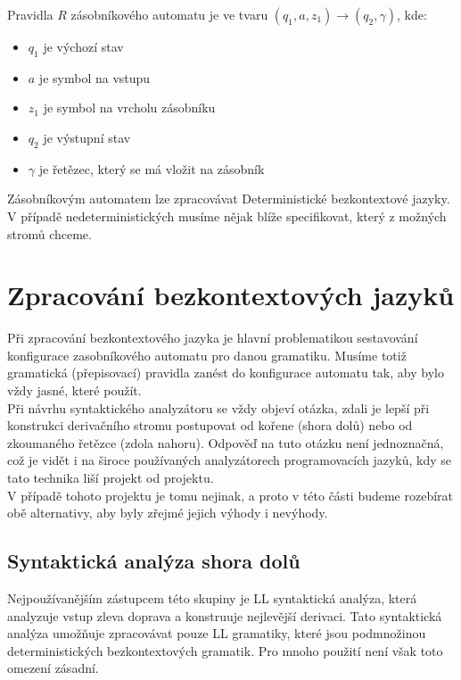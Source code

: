 \noindent
Pravidla $R$ zásobníkového automatu je ve tvaru $(q_1, a, z_1) \rightarrow (q_2, \gamma)$, kde:

\begin{itemize}
  \item $q_1$ je výchozí stav
  \item $a$ je symbol na vstupu
  \item $z_1$ je symbol na vrcholu zásobníku
  \item $q_2$ je výstupní stav
  \item $\gamma$ je řetězec, který se má vložit na zásobník
\end{itemize}

Zásobníkovým automatem lze zpracovávat Deterministické bezkontextové jazyky.
V případě nedeterministických musíme nějak blíže specifikovat, který z možných
stromů chceme.\\

\section{Zpracování bezkontextových jazyků}
\label{sec:CFLanguagesProcessing}

Při zpracování bezkontextového jazyka je hlavní problematikou
sestavování konfigurace zasobníkového automatu pro danou gramatiku.
Musíme totiž gramatická (přepisovací) pravidla zanést do konfigurace
automatu tak, aby bylo vždy jasné, které použít.\\

Při návrhu syntaktického analyzátoru se vždy objeví otázka, zdali je lepší
při konstrukci derivačního stromu postupovat od kořene (shora dolů) nebo od
zkoumaného řetězce (zdola nahoru). Odpověď na tuto otázku není jednoznačná,
což je vidět i na široce používaných analyzátorech programovacích jazyků,
kdy se tato technika liší projekt od projektu.\\

V případě tohoto projektu je tomu nejinak, a proto v této části budeme rozebírat
obě alternativy, aby byly zřejmé jejich výhody i nevýhody.

\subsection{Syntaktická analýza shora dolů}

Nejpoužívanějším zástupcem této skupiny je LL syntaktická analýza, která analyzuje
vstup zleva doprava a konstruuje nejlevější derivaci. Tato syntaktická analýza
umožňuje zpracovávat pouze LL gramatiky,
které jsou podmnožinou deterministických bezkontextových gramatik.
Pro mnoho použití není však toto omezení zásadní.\\

